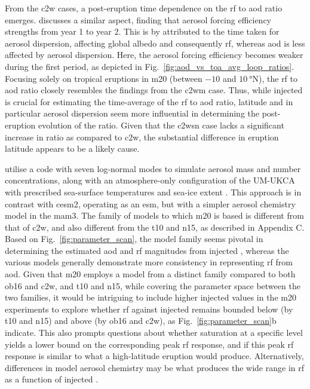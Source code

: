 \documentclass{ametsocV6.1}
\newcommand{\iso}[1][i]{{#1}njected \ce{SO2}}
\begin{document}
From the \gls{c2w} cases, a post-eruption time dependence on the \gls{rf} to \gls{aod}
ratio emerges. \citet{marshall2020} discusses a similar aspect, finding that aerosol
forcing efficiency strengths from year 1 to year 2. This is by \citet{marshall2020}
attributed to the time taken for aerosol dispersion, affecting global albedo and
consequently \gls{rf}, whereas \gls{aod} is less affected by aerosol dispersion. Here,
the aerosol forcing efficiency becomes weaker during the first period, as depicted in
Fig.~\ref{fig:aod_vs_toa_avg_loop_ratios}. Focusing solely on tropical eruptions in
\gls{m20} (between \(-10\) and \(\SI{10}{\degree\mathrm{N}}\)), the \gls{rf} to
\gls{aod} ratio closely resembles the findings from the \gls{c2wm} case. Thus, while
\iso{} is crucial for estimating the time-average of the \gls{rf} to \gls{aod} ratio,
latitude and in particular aerosol dispersion seem more influential in determining the
post-eruption evolution of the ratio. Given that the \gls{c2wsn} case lacks a significant
increase in ratio as compared to \gls{c2w}, the substantial difference in eruption
latitude appears to be a likely cause.

\citet{marshall2019, marshall2020, marshall2021} utilise a code with seven log-normal
modes to simulate aerosol mass and number concentrations, along with an atmosphere-only
configuration of the UM-UKCA with prescribed sea-surface temperatures and sea-ice extent
\citep{marshall2019}. This approach is in contrast with \gls{cesm2}, operating as an
\gls{esm}, but with a simpler aerosol chemistry model in the \gls{mam3}. The family of
models to which \gls{m20} is based is different from that of \gls{c2w}, and also
different from the \gls{t10} and \gls{n15}, as described in Appendix C. Based on
Fig.~\ref{fig:parameter_scan}, the model family seems pivotal in determining the
estimated \gls{aod} and \gls{rf} magnitudes from \iso{}, whereas the various models
generally demonstrate more consistency in representing \gls{rf} from \gls{aod}. Given
that \gls{m20} employs a model from a distinct family compared to both \gls{ob16} and
\gls{c2w}, and \gls{t10} and \gls{n15}, while covering the parameter space between the
two families, it would be intriguing to include higher \iso{} values in the \gls{m20}
experiments to explore whether \gls{rf} against \iso{} remains bounded below (by
\gls{t10} and \gls{n15}) and above (by \gls{ob16} and \gls{c2w}), as
Fig.~\ref{fig:parameter_scan}b indicate. This also prompts questions about whether
 saturation at a specific level yields a lower bound on the corresponding peak
\gls{rf} response, and if this peak \gls{rf} response is similar to what a high-latitude
eruption would produce. Alternatively, differences in model aerosol chemistry may be
what produces the wide range in \gls{rf} as a function of \iso{}.
\end{document}
